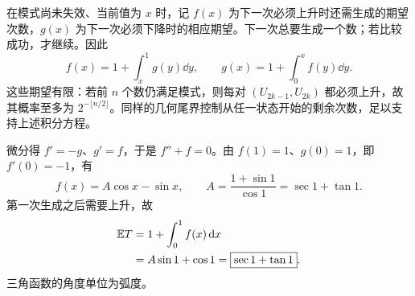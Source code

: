 在模式尚未失效、当前值为 $x$ 时，记 $f(x)$ 为下一次必须上升时还需生成的期望次数，$g(x)$ 为下一次必须下降时的相应期望。下一次总要生成一个数；若比较成功，才继续。因此
\[
f(x)=1+\int_x^1g(y)\dd y,\qquad
 g(x)=1+\int_0^xf(y)\dd y.
\]
这些期望有限：若前 $n$ 个数仍满足模式，则每对 $(U_{2k-1},U_{2k})$ 都必须上升，故其概率至多为 $2^{-\lfloor n/2\rfloor}$。同样的几何尾界控制从任一状态开始的剩余次数，足以支持上述积分方程。

微分得 $f'=-g$、$g'=f$，于是 $f''+f=0$。由 $f(1)=1$、$g(0)=1$，即 $f'(0)=-1$，有
\[
f(x)=A\cos x-\sin x,\qquad
A=\frac{1+\sin1}{\cos1}=\sec1+\tan1.
\]
第一次生成之后需要上升，故
\[
\begin{aligned}
\mathbb{E} T&=1+\int_0^1 f(x)\,\mathrm{d} x\\
&=A\sin1+\cos1
=\boxed{\sec1+\tan1}.
\end{aligned}
\]
三角函数的角度单位为弧度。
